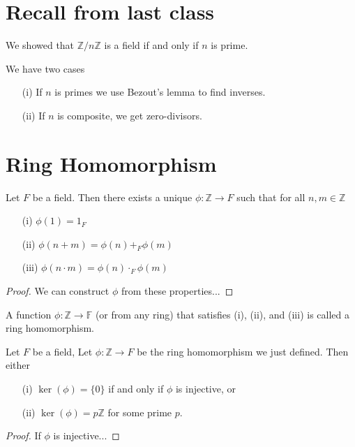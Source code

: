 
\section{Recall from last class}
\begin{eg}
    We showed that \(\mathbb{Z} /n\mathbb{Z} \) is a field if and only if \(n\) is prime. 
\end{eg}
\begin{explanation}
    We have two cases
    \begin{itemize}
        \item[(i)] If \(n\) is primes we use Bezout's lemma to find inverses.
        \item[(ii)] If \(n\) is composite, we get zero-divisors. 
    \end{itemize}
\end{explanation}

\section{Ring Homomorphism}
\begin{lemma}
    Let \(F\) be a field. Then there exists a unique \(\phi \colon \mathbb{Z} \to F\) such that for all \(n,m \in \mathbb{Z} \)
    \begin{itemize}
        \item[(i)] \(\phi (1) = 1_F\)
        \item[(ii)] \(\phi (n+m) = \phi (n) +_F \phi (m)\)
        \item[(iii)] \(\phi (n\cdot m) = \phi (n) \cdot_F \phi (m)\)   
    \end{itemize}  
\end{lemma}
\begin{proof}
    We can construct \(\phi \) from these properties...
\end{proof}
\begin{note}
    A function \(\phi \colon \mathbb{Z} \to \mathbb{F} \) (or from any ring) that satisfies (i), (ii), and (iii) is called a ring homomorphism.
\end{note}

\begin{lemma}
    Let \(F\) be a field, Let \(\phi \colon \mathbb{Z} \to F \) be the ring homomorphism we just defined. Then either
    \begin{itemize}
        \item[(i)] \(\ker(\phi ) = \{ 0 \} \) if and only if \(\phi \) is injective, or
        \item[(ii)] \(\ker(\phi ) = p\mathbb{Z} \) for some prime \(p\).
    \end{itemize}
\end{lemma}
\begin{proof}
    If \(\phi \) is injective... 
\end{proof}

